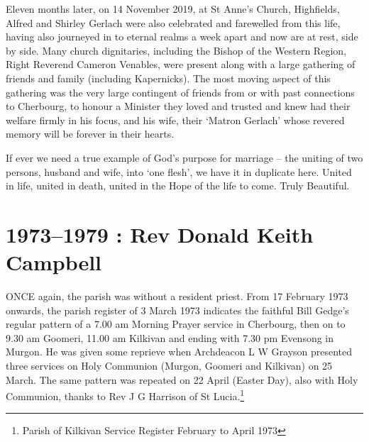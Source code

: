 Eleven months later, on 14 November 2019, at St Anne's Church, Highfields, Alfred and Shirley Gerlach were also celebrated and farewelled from this life, having also journeyed in to eternal realms a week apart and now are at rest, side by side. Many church dignitaries, including the Bishop of the Western Region, Right Reverend Cameron Venables, were present along with a large gathering of friends and family (including Kapernicks). The most moving aspect of this gathering was the very large contingent of friends from or with past connections to Cherbourg, to honour a Minister they loved and trusted and knew had their welfare firmly in his focus, and his wife, their `Matron Gerlach' whose revered memory will be forever in their hearts.



If ever we need a true example of God's purpose for marriage -- the uniting of two persons, husband and wife, into `one flesh', we have it in duplicate here. United in life, united in death, united in the Hope of the life to come. Truly Beautiful.



\balance


\printendnotes[custom]
\setcounter{endnote}{0}
\chapter{1973--1979 : Rev Donald Keith Campbell}
\nobalance


\lettrine[lines=3]{O}{NCE}
 again, the parish was without a resident priest. From 17 February 1973 onwards, the parish register of 3 March 1973 indicates the faithful Bill Gedge's regular pattern of a 7.00 am Morning Prayer service in Cherbourg, then on to 9.30 am Goomeri, 11.00 am Kilkivan and ending with 7.30 pm Evensong in Murgon. He was given some reprieve when Archdeacon L W Grayson presented three services on Holy Communion (Murgon, Goomeri and Kilkivan) on 25 March. The same pattern was repeated on 22 April (Easter Day), also with Holy Communion, thanks to Rev J G Harrison of St Lucia.\footnote{Parish of Kilkivan Service Register February to April 1973}







